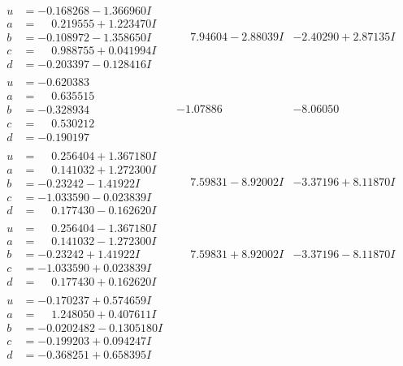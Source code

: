 \documentclass[1p]{elsarticle_modified}
\theoremstyle{definition}
\begin{document}
$$\begin{array}{c|c|c}
\begin{aligned}
u &= -0.168268 - 1.366960 I \\
a &= \phantom{-}0.219555 + 1.223470 I \\
b &= -0.108972 - 1.358650 I \\
c &= \phantom{-}0.988755 + 0.041994 I \\
d &= -0.203397 - 0.128416 I\end{aligned}
 & \phantom{-}7.94604 - 2.88039 I & -2.40290 + 2.87135 I \\ \hline\begin{aligned}
u &= -0.620383\phantom{ +0.000000I} \\
a &= \phantom{-}0.635515\phantom{ +0.000000I} \\
b &= -0.328934\phantom{ +0.000000I} \\
c &= \phantom{-}0.530212\phantom{ +0.000000I} \\
d &= -0.190197\phantom{ +0.000000I}\end{aligned}
 & -1.07886\phantom{ +0.000000I} & -8.06050\phantom{ +0.000000I} \\ \hline\begin{aligned}
u &= \phantom{-}0.256404 + 1.367180 I \\
a &= \phantom{-}0.141032 + 1.272300 I \\
b &= -0.23242 - 1.41922 I \\
c &= -1.033590 - 0.023839 I \\
d &= \phantom{-}0.177430 - 0.162620 I\end{aligned}
 & \phantom{-}7.59831 - 8.92002 I & -3.37196 + 8.11870 I \\ \hline\begin{aligned}
u &= \phantom{-}0.256404 - 1.367180 I \\
a &= \phantom{-}0.141032 - 1.272300 I \\
b &= -0.23242 + 1.41922 I \\
c &= -1.033590 + 0.023839 I \\
d &= \phantom{-}0.177430 + 0.162620 I\end{aligned}
 & \phantom{-}7.59831 + 8.92002 I & -3.37196 - 8.11870 I \\ \hline\begin{aligned}
u &= -0.170237 + 0.574659 I \\
a &= \phantom{-}1.248050 + 0.407611 I \\
b &= -0.0202482 - 0.1305180 I \\
c &= -0.199203 + 0.094247 I \\
d &= -0.368251 + 0.658395 I\end{aligned}

\end{array}$$
\end{document}
